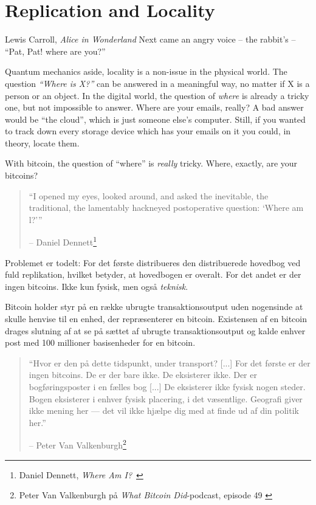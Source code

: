 \chapter{Replication and Locality}
\label{les:3}

\begin{chapquote}{Lewis Carroll, \textit{Alice in Wonderland}}
Next came an angry voice -- the rabbit's -- \enquote{Pat, Pat! where are you?}
\end{chapquote}

Quantum mechanics aside, locality is a non-issue in the physical world.
The question \textit{\enquote{Where is X?}} can be answered in a meaningful way, no
matter if X is a person or an object. In the digital world, the question
of \textit{where} is already a tricky one, but not impossible to answer. Where
are your emails, really? A bad answer would be \enquote{the cloud}, which is
just someone else's computer. Still, if you wanted to track down every
storage device which has your emails on it you could, in theory, locate
them.

With bitcoin, the question of \enquote{where} is \textit{really} tricky. Where,
exactly, are your bitcoins?

\begin{quotation}\begin{samepage}
\enquote{I opened my eyes, looked around, and asked the inevitable, the
traditional, the lamentably hackneyed postoperative question: `Where
am l?'}
\begin{flushright} -- Daniel Dennett\footnote{Daniel Dennett, \textit{Where Am I?}~\cite{where-am-i}}
\end{flushright}\end{samepage}\end{quotation}

Problemet er todelt: For det første distribueres den distribuerede hovedbog ved fuld replikation, hvilket betyder, at hovedbogen er overalt. For det andet er der ingen bitcoins. Ikke kun fysisk, men også \textit{teknisk}.

Bitcoin holder styr på en række ubrugte transaktionsoutput uden nogensinde at skulle henvise til en enhed, der repræsenterer en bitcoin. Existensen af en bitcoin drages slutning af at se på sættet af ubrugte transaktionsoutput og kalde enhver post med 100 millioner basisenheder for en bitcoin.

\begin{quotation}\begin{samepage}
\enquote{Hvor er den på dette tidspunkt, under transport? [...] For det første er der ingen
bitcoins. De er der bare ikke. De eksisterer ikke. Der er bogføringsposter i en fælles bog [...] De eksisterer ikke fysisk nogen steder. Bogen eksisterer i enhver fysisk placering, i det væsentlige. Geografi giver ikke mening her --- det vil ikke hjælpe dig med at finde ud af din politik her.}
\begin{flushright} -- Peter Van Valkenburgh\footnote{Peter Van Valkenburgh på \textit{What Bitcoin Did}-podcast, episode 49 \cite{wbd049}}
\end{flushright}\end{samepage}\end{quotation}

